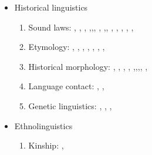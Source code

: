 \documentclass[oldfontcommands,oneside,a4paper,11pt]{article}
\begin{document}
\begin{itemize}
\item Historical linguistics
\begin{enumerate}
\item Sound laws:  \citet{jacques00ywij}, \citet{jacques01dg}, \citet{jacques03dissimilation},   \citet{jacques04thimphu},\citet{jacques06comparaison},\citet{jacques09wazur}, \citet{jacques09e}, \citet{michaud10bonin},\citet{jacques10ndr}, \citet{jacques.michaud11naish},   \citet{rg-gj12yod}, \citet{jacques13arapaho}, \citet{jacques13yod}, \citet{jacques14snom},   \citet{jacques14esquisse}
\item  Etymology:    \citet{jacques07naksatram}, \citet{jacques08debther}, \citet{jacques09zz}, \citet{jacques10imperial}, \citet{jacques11ngwemi}, \citet{jacques12bear},  \citet{jacques13vama},   \citet{jacques14esquisse}
\item Historical morphology:  \citet{jacques03s.houzhui}, \citet{jacques06morpho}, \citet{jacques07chang},    \citet{jacques09tangutverb}, \citet{jacques10zos},\citet{jacques11tangut.verb},\citet{jacques12agreement},\citet{jacques12internal}, \citet{jacques14antipassive},   \citet{jacques14esquisse}
\item Language contact: \citet{antonov12kumush},   \citet{jacques12bear},
\item Genetic linguistics:  \citet{jacques07chang}, \citet{jacques12agreement}, \citet{jacques2015genetic},
\end{enumerate}
\item Ethnolinguistics
\begin{enumerate}
\item Kinship: \citet{jacques11kinship},  

\end{enumerate}
  
  
\end{itemize}




\end{document}
